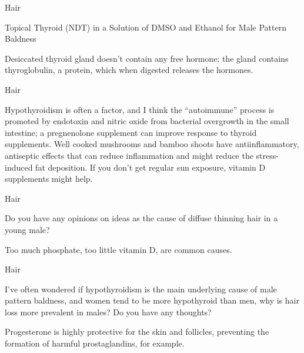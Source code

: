 \documentclass[11pt,oneside,openany,extrafontsizes]{memoir}
\begin{document}
\begin{standalonequote}{Hair}
    \begin{note}
        Topical Thyroid (NDT) in a Solution of DMSO and Ethanol for Male Pattern Baldness
    \end{note}

    \begin{answer}
        Desiccated thyroid gland doesn't contain any free hormone; the gland contains thyroglobulin, a protein, which when digested releases the hormones.
    \end{answer}
\end{standalonequote}

\begin{standalonequote}{Hair}

    \begin{answer}
      Hypothyroidism is often a factor, and I think the \enquote{autoimmune} process is promoted by endotoxin and nitric oxide from bacterial overgrowth in the small intestine; a pregnenolone supplement can improve response to thyroid supplements. Well cooked mushrooms and bamboo shoots have antiinflammatory, antiseptic effects that can reduce inflammation and might reduce the stress-induced fat deposition. If you don't get regular sun exposure, vitamin D supplements might help.
    \end{answer}
\end{standalonequote}

\begin{qaexchange}{Hair}

    \begin{question}
        Do you have any opinions on ideas as the cause of diffuse thinning hair in a young male?
    \end{question}

    \begin{answer}
       Too much phosphate, too little vitamin D, are common causes. 
    \end{answer}
\end{qaexchange}

\begin{qaexchange}{Hair}

    \begin{question}
        I've often wondered if hypothyroidism is the main underlying cause of male pattern baldness, and women tend to be more hypothyroid than men, why is hair loss more prevalent in males? Do you have any thoughts?
    \end{question}

    \begin{answer}
      Progesterone is highly protective for the skin and follicles, preventing the formation of harmful prostaglandins, for example.
    \end{answer}
\end{qaexchange}
\end{document}
